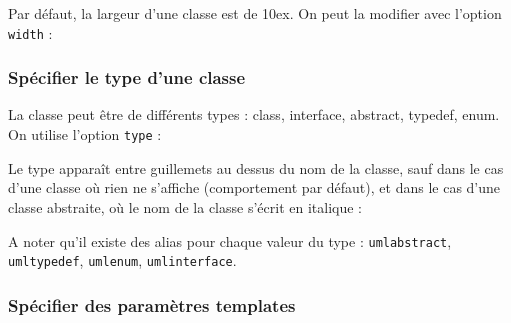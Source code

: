 \documentclass[a4paper,11pt]{report}
\newcommand{\inputTikZ}[1]{%
  }%
\newcommand{\inputTikZ}[1]{%
    \texttt{[image: fig/\#1.pdf]}%
  }%
\begin{document}
Par défaut, la largeur d'une classe est de 10ex. On peut la modifier avec l'option {\tt width} :

\medskip

\begin{minipage}{0.5\textwidth}

\end{minipage}
\begin{minipage}{0.4\textwidth}
\begin{center}
\inputTikZ{classwidth}
\end{center}
\end{minipage}

\subsubsection{Spécifier le type d'une classe}

La classe peut être de différents types : class, interface, abstract, typedef, enum. On utilise l'option {\tt type} :

\medskip

\begin{minipage}{0.5\textwidth}

\end{minipage}
\begin{minipage}{0.4\textwidth}
\begin{center}
\inputTikZ{classtype}
\end{center}
\end{minipage}

\medskip

Le type apparaît entre guillemets au dessus du nom de la classe, sauf dans le cas d'une classe où rien ne s'affiche (comportement par défaut), et dans le cas d'une classe abstraite, où le nom de la classe s'écrit en italique :

\medskip

\begin{minipage}{0.5\textwidth}

\end{minipage}
\begin{minipage}{0.4\textwidth}
\begin{center}
\inputTikZ{classabstract}
\end{center}
\end{minipage}

A noter qu'il existe des alias pour chaque valeur du type : {\tt umlabstract}, {\tt umltypedef}, {\tt umlenum}, {\tt umlinterface}.

\subsubsection{Spécifier des paramètres templates}
\end{document}
